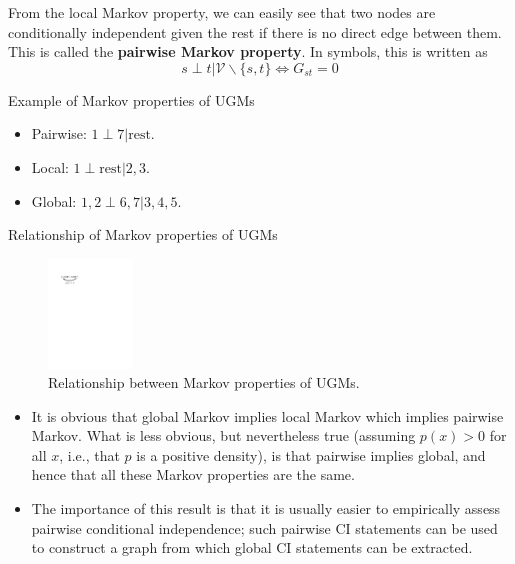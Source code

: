 \documentclass[10pt,mathserif]{beamer}
\begin{document}
\begin{frame}{}
From the local Markov property, we can easily see that two nodes are conditionally independent given the rest if there is no direct edge between them. This is called the \textbf{pairwise Markov property}. In symbols, this is written as
\begin{equation}
    s\perp t |\mathcal{V}\backslash\{s,t\}\Longleftrightarrow G_{st}=0
\end{equation}
\end{frame}
 
\begin{frame}{Example of Markov properties of UGMs}
\begin{itemize}
    \item Pairwise: $1\perp7|\text{rest}$.
    \item Local: $1\perp \text{rest}|2,3$.
    \item Global: $1,2 \perp 6,7|3,4,5$.
\end{itemize}
\end{frame}

\begin{frame}{Relationship of Markov properties of UGMs}
\begin{figure}[h]
\centering
\includegraphics[width=0.2\textwidth]{markovProperties}
\caption{Relationship between Markov properties of UGMs.}
\end{figure}

\begin{itemize}
    \item It is obvious that global Markov implies local Markov which implies pairwise Markov. What is less obvious, but nevertheless true (assuming $p(x) > 0$ for all $x$, i.e., that $p$ is a positive density), is that pairwise implies global, and hence that all these Markov properties are the same.
    \item  The importance of this result is that it is usually easier to empirically assess pairwise conditional independence; such pairwise CI statements can be used to construct a graph from which global CI statements can be extracted.
\end{itemize}
\end{frame}
\end{document}

